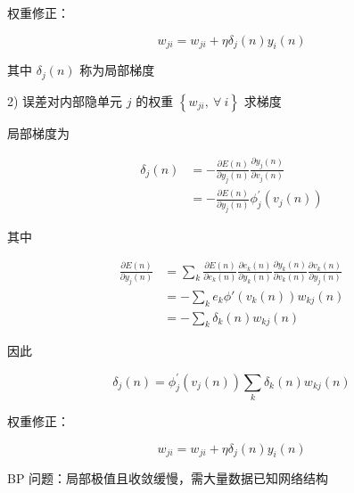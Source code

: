\documentclass[openany,a4paper,12pt]{ctexbook}
\theoremstyle{kaiti}
\theoremstyle{normal}
\begin{document}
权重修正：

\begin{equation}
w_{ji}=w_{ji}+\eta \delta_j\left(n \right)y_i\left(n \right)
\end{equation}

其中 $\delta_j\left(n \right)$ 称为局部梯度

2) 误差对内部隐单元 $j$ 的权重 $\left\{ w_{ji},~\forall~i \right\}$ 求梯度

局部梯度为

\begin{equation}
\begin{aligned}
  \delta_j\left(n \right)
  &=-\frac{\partial E\left(n \right)}{\partial y_j\left(n \right)}\frac{\partial y_j\left(n \right)}{\partial v_j\left(n \right)}\\
  &=-\frac{\partial E\left(n \right)}{\partial y_j\left(n \right)}\phi_{j}^{'}\left(v_j\left(n \right)\right)
\end{aligned}
\end{equation}

其中

\begin{equation}
\begin{aligned}
  \frac{\partial E\left(n \right)}{\partial y_j\left(n \right)}
  &=\sum_k{\frac{\partial E\left(n \right)}{\partial e_k\left(n \right)}\frac{\partial e_k\left(n \right)}{\partial y_k\left(n \right)}\frac{\partial y_k\left(n \right)}{\partial v_k\left(n \right)}\frac{\partial v_k\left(n \right)}{\partial y_j\left(n \right)}}\\
  &=-\sum_ke_k\phi '\left(v_k\left(n \right)\right)w_{kj}\left(n \right)\\
  &=-\sum_k\delta_k\left(n \right)w_{kj}\left(n \right)
\end{aligned}
\end{equation}

因此

\begin{equation}
\delta_j\left(n \right)=\phi_{j}^{'}\left(v_j\left(n \right)\right)\sum_k\delta_k\left(n \right)w_{kj}\left(n \right)
\end{equation}

权重修正：

\begin{equation}
w_{ji}=w_{ji}+\eta \delta_j\left(n \right)y_i\left(n \right)
\end{equation}

BP 问题：局部极值且收敛缓慢，需大量数据已知网络结构
\end{document}
